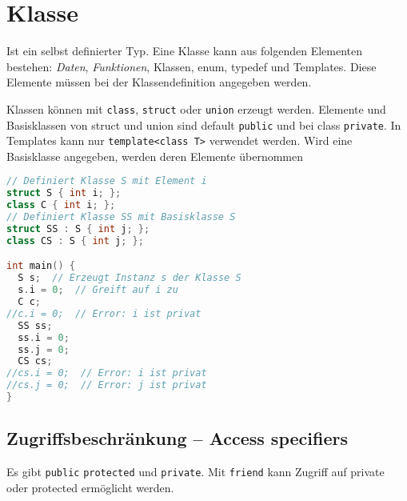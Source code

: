 \section{Klasse}

Ist ein selbst definierter Typ. Eine Klasse kann aus folgenden Elementen
bestehen: \emph{Daten}, \emph{Funktionen}, Klassen, enum, typedef und Templates.
Diese Elemente müssen bei der Klassendefinition angegeben werden.

Klassen können mit \lstinline|class|, \lstinline|struct| oder \lstinline|union|
erzeugt werden. Elemente und Basisklassen von struct und union sind default
\lstinline|public| und bei class \lstinline|private|. In Templates kann nur
\lstinline|template<class T>| verwendet werden. Wird eine Basisklasse angegeben,
werden deren Elemente übernommen

\begin{lstlisting}[language=C++]
// Definiert Klasse S mit Element i
struct S { int i; };
class C { int i; };
// Definiert Klasse SS mit Basisklasse S
struct SS : S { int j; };
class CS : S { int j; };

int main() {
  S s;  // Erzeugt Instanz s der Klasse S
  s.i = 0;  // Greift auf i zu
  C c;
//c.i = 0;  // Error: i ist privat
  SS ss;
  ss.i = 0;
  ss.j = 0;
  CS cs;
//cs.i = 0;  // Error: i ist privat
//cs.j = 0;  // Error: j ist privat
}
\end{lstlisting}

\subsection{Zugriffsbeschränkung -- Access specifiers}
\label{subsec:Klasse:Zugriffsbeschränkung}

Es gibt \lstinline|public| \lstinline|protected| und \lstinline|private|. Mit
\lstinline|friend| kann Zugriff auf private oder protected ermöglicht werden.

